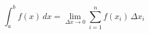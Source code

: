 \documentclass{article}
\begin{document}
\[
  \int_a^b \! f(x) \, dx = \lim_{\Delta x \rightarrow 0}
  \sum_{i=1}^{n} f(x_i) \,\Delta x_i
\]
\end{document}
